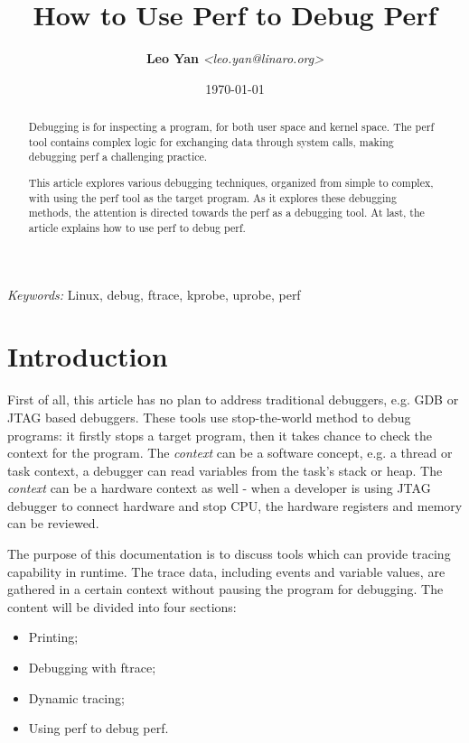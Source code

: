 \documentclass[11pt]{diazessay} %
\title{\textbf{How to Use Perf to Debug Perf}}
\author{\textbf{Leo Yan} \textit{<leo.yan@linaro.org>}} %
\date{\today} %
\begin{document}
\maketitle %


\begin{abstract}
Debugging is for inspecting a program, for both user space and kernel space.
The perf tool contains complex logic for exchanging data through system calls,
making debugging perf a challenging practice.

This article explores various debugging techniques, organized from simple to
complex, with using the perf tool as the target program. As it explores these
debugging methods, the attention is directed towards the perf as a debugging
tool. At last, the article explains how to use perf to debug perf.
\end{abstract}

\hspace*{3.6mm}\textit{Keywords: } Linux, debug, ftrace, kprobe, uprobe, perf
\vspace{30pt} %


\section*{Introduction}

First of all, this article has no plan to address traditional debuggers, e.g.
GDB or JTAG based debuggers. These tools use stop-the-world method to debug
programs: it firstly stops a target program, then it takes chance to check
the context for the program. The \textit{context} can be a software concept,
e.g. a thread or task context, a debugger can read variables from the task's
stack or heap. The \textit{context} can be a hardware context as well - when
a developer is using JTAG debugger to connect hardware and stop CPU, the
hardware registers and memory can be reviewed.

The purpose of this documentation is to discuss tools which can provide
tracing capability in runtime. The trace data, including events and variable
values, are gathered in a certain context without pausing the program for
debugging. The content will be divided into four sections:
\begin{itemize}
	\item Printing;
	\item Debugging with ftrace;
	\item Dynamic tracing;
	\item Using perf to debug perf.
\end{itemize}
\end{document}

